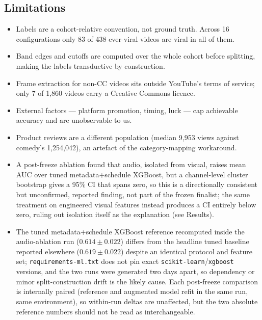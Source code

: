 \documentclass[letterpaper]{article}
\begin{document}
\subsection{Limitations}

\begin{itemize}
\item Labels are a cohort-relative convention, not ground truth. Across 16
      configurations only 83 of 438 ever-viral videos are viral in all of them.
\item Band edges and cutoffs are computed over the whole cohort before splitting,
      making the labels transductive by construction.
\item Frame extraction for non-CC videos sits outside YouTube's terms of service;
      only 7 of 1{,}860 videos carry a Creative Commons licence.
\item External factors --- platform promotion, timing, luck --- cap achievable
      accuracy and are unobservable to us.
\item Product reviews are a different population (median 9{,}953 views against
      comedy's 1{,}254{,}042), an artefact of the category-mapping workaround.
\item A post-freeze ablation found that audio, isolated from visual, raises
      mean AUC over tuned metadata+schedule XGBoost, but a channel-level
      cluster bootstrap gives a 95\% CI that spans zero, so this is a
      directionally consistent but unconfirmed, reported finding, not part of
      the frozen finalist; the same treatment on engineered visual features
      instead produces a CI entirely below zero, ruling out isolation itself
      as the explanation (see Results).
\item The tuned metadata+schedule XGBoost reference recomputed inside the
      audio-ablation run ($0.614\pm0.022$) differs from the headline tuned
      baseline reported elsewhere ($0.619\pm0.022$) despite an identical
      protocol and feature set; \texttt{requirements-ml.txt} does not pin
      exact \texttt{scikit-learn}/\texttt{xgboost} versions, and the two runs
      were generated two days apart, so dependency or minor split-construction
      drift is the likely cause. Each post-freeze comparison is internally
      paired (reference and augmented model refit in the same run, same
      environment), so within-run deltas are unaffected, but the two absolute
      reference numbers should not be read as interchangeable.
\end{itemize}
\end{document}
